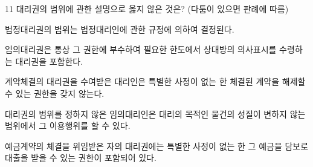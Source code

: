 \begin{question}{11}
대리권의 범위에 관한 설명으로 옳지 않은 것은? (다툼이 있으면 판례에 따름)
\begin{choices}
  \item 법정대리권의 범위는 법정대리인에 관한 규정에 의하여 결정된다.
  \item 임의대리권은 통상 그 권한에 부수하여 필요한 한도에서 상대방의 의사표시를 수령하는 대리권을 포함한다.
  \item 계약체결의 대리권을 수여받은 대리인은 특별한 사정이 없는 한 체결된 계약을 해제할 수 있는 권한을 갖지 않는다.
  \item 대리권의 범위를 정하지 않은 임의대리인은 대리의 목적인 물건의 성질이 변하지 않는 범위에서 그 이용행위를 할 수 있다.
  \item 예금계약의 체결을 위임받은 자의 대리권에는 특별한 사정이 없는 한 그 예금을 담보로 대출을 받을 수 있는 권한이 포함되어 있다.
\end{choices}
\end{question}
